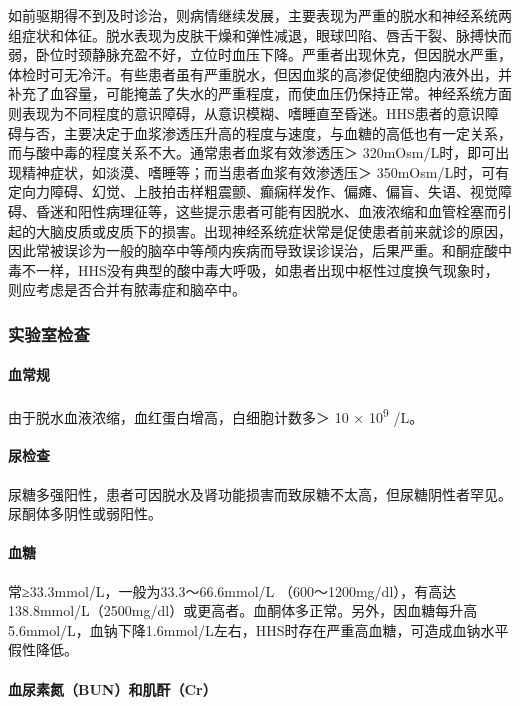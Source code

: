 如前驱期得不到及时诊治，则病情继续发展，主要表现为严重的脱水和神经系统两组症状和体征。脱水表现为皮肤干燥和弹性减退，眼球凹陷、唇舌干裂、脉搏快而弱，卧位时颈静脉充盈不好，立位时血压下降。严重者出现休克，但因脱水严重，体检时可无冷汗。有些患者虽有严重脱水，但因血浆的高渗促使细胞内液外出，并补充了血容量，可能掩盖了失水的严重程度，而使血压仍保持正常。神经系统方面则表现为不同程度的意识障碍，从意识模糊、嗜睡直至昏迷。HHS患者的意识障碍与否，主要决定于血浆渗透压升高的程度与速度，与血糖的高低也有一定关系，而与酸中毒的程度关系不大。通常患者血浆有效渗透压＞
320mOsm/L时，即可出现精神症状，如淡漠、嗜睡等；而当患者血浆有效渗透压＞
350mOsm/L时，可有定向力障碍、幻觉、上肢拍击样粗震颤、癫痫样发作、偏瘫、偏盲、失语、视觉障碍、昏迷和阳性病理征等，这些提示患者可能有因脱水、血液浓缩和血管栓塞而引起的大脑皮质或皮质下的损害。出现神经系统症状常是促使患者前来就诊的原因，因此常被误诊为一般的脑卒中等颅内疾病而导致误诊误治，后果严重。和酮症酸中毒不一样，HHS没有典型的酸中毒大呼吸，如患者出现中枢性过度换气现象时，则应考虑是否合并有脓毒症和脑卒中。

\subsubsection{实验室检查}

\paragraph{血常规}

由于脱水血液浓缩，血红蛋白增高，白细胞计数多＞ 10 ×
10\textsuperscript{9} /L。

\paragraph{尿检查}

尿糖多强阳性，患者可因脱水及肾功能损害而致尿糖不太高，但尿糖阴性者罕见。尿酮体多阴性或弱阳性。

\paragraph{血糖}

常≥33.3mmol/L，一般为33.3～66.6mmol/L
（600～1200mg/dl），有高达138.8mmol/L（2500mg/dl）或更高者。血酮体多正常。另外，因血糖每升高5.6mmol/L，血钠下降1.6mmol/L左右，HHS时存在严重高血糖，可造成血钠水平假性降低。

\paragraph{血尿素氮（BUN）和肌酐（Cr）}


